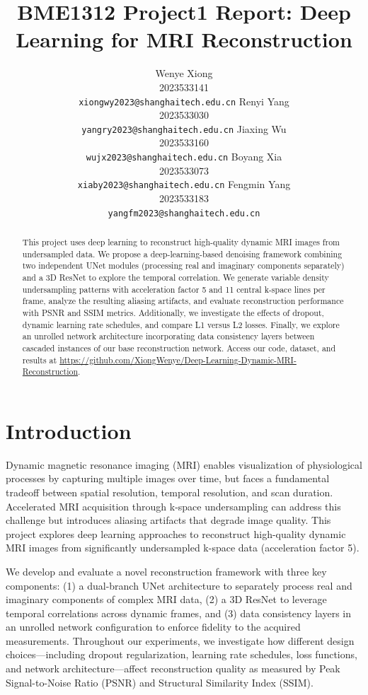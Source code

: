 \documentclass{article}
\title{BME1312 Project1 Report: Deep Learning for MRI Reconstruction}
\author{%
  Wenye Xiong \\
  2023533141 \\
  \texttt{xiongwy2023@shanghaitech.edu.cn}
  \And
  Renyi Yang \\
  2023533030 \\
  \texttt{yangry2023@shanghaitech.edu.cn}
  \AND
  Jiaxing Wu \\
  2023533160 \\
  \texttt{wujx2023@shanghaitech.edu.cn}
  \And
  Boyang Xia \\
  2023533073 \\
  \texttt{xiaby2023@shanghaitech.edu.cn}
  \AND
  Fengmin Yang \\
  2023533183 \\
  \texttt{yangfm2023@shanghaitech.edu.cn}
}
\begin{document}
\maketitle


\begin{abstract}
  This project uses deep learning to reconstruct high-quality dynamic MRI images
  from undersampled data. We propose a deep-learning-based denoising framework combining
  two independent UNet modules (processing real and imaginary components separately) and a 3D ResNet to explore the temporal correlation.
  We generate variable density undersampling patterns with acceleration factor 5 and
  11 central k-space lines per frame, analyze the resulting aliasing artifacts, and evaluate
  reconstruction performance with PSNR and SSIM metrics. Additionally,
  we investigate the effects of dropout, dynamic learning rate schedules,
  and compare L1 versus L2 losses. Finally, we explore an unrolled network architecture
  incorporating data consistency layers between cascaded instances of our base reconstruction network.
  Access our code, dataset, and results at \url{https://github.com/XiongWenye/Deep-Learning-Dynamic-MRI-Reconstruction}.
\end{abstract}

\section{Introduction}
Dynamic magnetic resonance imaging (MRI) enables visualization of physiological processes by capturing multiple images over time, but faces a fundamental tradeoff between spatial resolution, temporal resolution, and scan duration. Accelerated MRI acquisition through k-space undersampling can address this challenge but introduces aliasing artifacts that degrade image quality. This project explores deep learning approaches to reconstruct high-quality dynamic MRI images from significantly undersampled k-space data (acceleration factor 5).

We develop and evaluate a novel reconstruction framework with three key components: (1) a dual-branch UNet architecture to separately process real and imaginary components of complex MRI data, (2) a 3D ResNet to leverage temporal correlations across dynamic frames, and (3) data consistency layers in an unrolled network configuration to enforce fidelity to the acquired measurements. Throughout our experiments, we investigate how different design choices—including dropout regularization, learning rate schedules, loss functions, and network architecture—affect reconstruction quality as measured by Peak Signal-to-Noise Ratio (PSNR) and Structural Similarity Index (SSIM).
\end{document}
